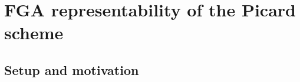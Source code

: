 \chapter{FGA representability of the Picard scheme}
\label{chap:Picard_FGAPicRepresentability}



\section{Setup and motivation}
\label{sec:fga_pic_setup}

